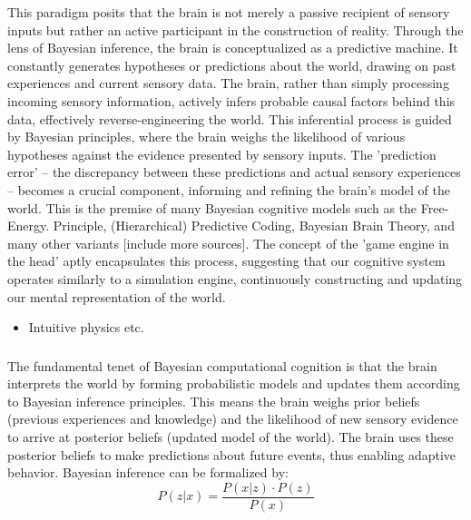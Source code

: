 This paradigm posits that the brain is not merely a passive recipient of sensory inputs but rather an active participant in the construction of reality. Through the lens of Bayesian inference, the brain is conceptualized as a predictive machine. It constantly generates hypotheses or predictions about the world, drawing on past experiences and current sensory data. The brain, rather than simply processing incoming sensory information, actively infers probable causal factors behind this data, effectively reverse-engineering the world. This inferential process is guided by Bayesian principles, where the brain weighs the likelihood of various hypotheses against the evidence presented by sensory inputs. The 'prediction error' – the discrepancy between these predictions and actual sensory experiences – becomes a crucial component, informing and refining the brain's model of the world. This is the premise of many Bayesian cognitive models such as the Free-Energy. Principle, (Hierarchical) Predictive Coding, Bayesian Brain Theory, and many other variants \cite{friston_free-energy_2010, friston_world_2021} [include more sources].
The concept of the 'game engine in the head' aptly encapsulates this process, suggesting that our cognitive system operates similarly to a simulation engine, continuously constructing and updating our mental representation of the world.



\begin{itemize}
    \item Intuitive physics etc.
\end{itemize}

\subsubsection{}

The fundamental tenet of Bayesian computational cognition is that the brain interprets the world by forming probabilistic models and updates them according to Bayesian inference principles. This means the brain weighs prior beliefs (previous experiences and knowledge) and the likelihood of new sensory evidence to arrive at posterior beliefs (updated model of the world). The brain uses these posterior beliefs to make predictions about future events, thus enabling adaptive behavior.
Bayesian inference can be formalized by:
\begin{equation}\label{form:bayes}
    P(z \vert x) = \frac{P(x \vert z) \cdot P(z)}{P(x)}    
\end{equation}

